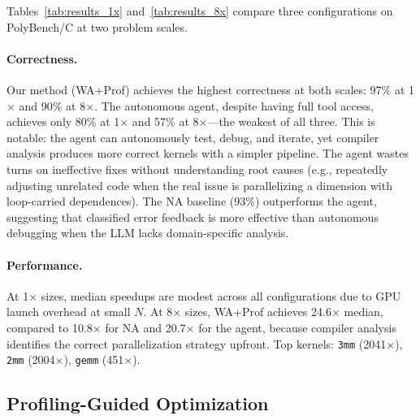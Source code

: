 Tables~\ref{tab:results_1x} and~\ref{tab:results_8x} compare three configurations on PolyBench/C at two problem scales.

\paragraph{Correctness.}
Our method (WA+Prof) achieves the highest correctness at both scales: 97\% at 1$\times$ and 90\% at 8$\times$.
The autonomous agent, despite having full tool access, achieves only 80\% at 1$\times$ and 57\% at 8$\times$---the weakest of all three.
This is notable: the agent can autonomously test, debug, and iterate, yet compiler analysis produces more correct kernels with a simpler pipeline.
The agent wastes turns on ineffective fixes without understanding root causes (e.g., repeatedly adjusting unrelated code when the real issue is parallelizing a dimension with loop-carried dependences).
The NA baseline (93\%) outperforms the agent, suggesting that classified error feedback is more effective than autonomous debugging when the LLM lacks domain-specific analysis.

\paragraph{Performance.}
At 1$\times$ sizes, median speedups are modest across all configurations due to GPU launch overhead at small $N$.
At 8$\times$ sizes, WA+Prof achieves 24.6$\times$ median, compared to 10.8$\times$ for NA and 20.7$\times$ for the agent, because compiler analysis identifies the correct parallelization strategy upfront.
Top kernels: \texttt{3mm} (2041$\times$), \texttt{2mm} (2004$\times$), \texttt{gemm} (451$\times$).

\subsection{Profiling-Guided Optimization}

